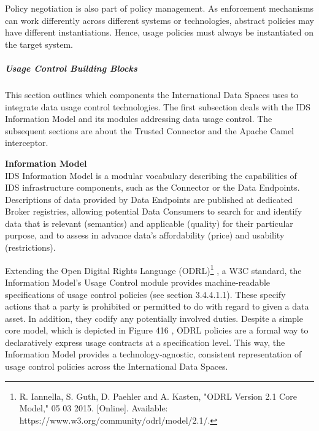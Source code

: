 Policy negotiation is also part of policy management. As enforcement mechanisms can work differently across different systems or technologies, abstract policies may have different instantiations. Hence, usage policies must always be instantiated on the target system.

\subparagraph*{Usage Control Building Blocks \\}
 This section outlines which components the  International  Data Spaces uses to integrate data usage control technologies. The first subsection deals with the IDS Information Model and its modules addressing data usage control. The subsequent sections are about the Trusted Connector and the Apache Camel interceptor.  


\textbf{Information Model}\\
IDS  Information Model is a modular vocabulary describing the capabilities of IDS infrastructure components, such as the Connector or the Data Endpoints. Descriptions of data provided by Data Endpoints are published at dedicated Broker registries, allowing potential Data Consumers to search for and identify data that is relevant (semantics) and applicable (quality) for their particular  purpose, and to assess in advance data’s affordability (price) and usability (restrictions).

Extending the Open Digital Rights Language (ODRL)\footnote{ R. Iannella, S. Guth, D. Paehler and A. Kasten, "ODRL Version 2.1 Core Model," 05 03 2015. [Online]. Available: https://www.w3.org/community/odrl/model/2.1/.}  , a W3C standard, the Information Model’s Usage Control module provides machine-readable specifications of usage control policies (see section 3.4.4.1.1). These specify actions that a party is prohibited or permitted to do with regard to given a data asset. In addition, they codify any potentially involved duties. Despite a simple core model, which is depicted in  Figure 416 , ODRL policies are a formal way to declaratively express usage contracts at a specification level. This way, the Information Model provides a technology-agnostic, consistent representation of usage control policies across the International Data Spaces. 




